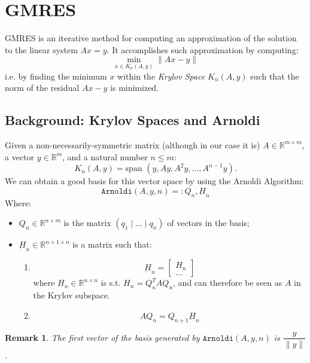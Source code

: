 \documentclass{article}
\newcommand{\reals}{\mathbb R}
\newcommand{\rmatr}[2]{\reals ^ {{#1} \times {#2}} }
\newcommand{\rvect}[1]{\reals ^ {{#1}} }
\newcommand{\spann}{\text{span }}
\newcommand{\hess}{\underbar H}
\newcommand{\arnoldi}{\texttt{Arnoldi}}
\newtheorem{remark}{Remark}
\begin{document}
 \section{GMRES}
 
GMRES is an iterative method for computing an approximation of the solution to the linear system $Ax = y$. It accomplishes such approximation by computing:
 \[\min_{x \in K_n(A, y)} \|Ax - y\|\]
 i.e. by finding the minimum $x$ within the \emph{Krylov Space} $K_n(A, y)$ such that the norm of the residual $Ax - y$ is minimized.
 \subsection{Background: Krylov Spaces and Arnoldi} 
 Given a non-necessarily-symmetric matrix (although in our case it is) $A \in \rmatr mm$, a vector $y \in \rvect m$, and a natural number $n\leq m$:
 \[K_n(A, y) = \spann (y, Ay, A^2y, \hdots, A^{n-1}y).\]
 We can obtain a good basis for this vector space by using the Arnoldi Algorithm:
 \[\arnoldi(A, y, n) =: Q_n, \hess_n\]
 Where:
 \begin{itemize}
  \item $Q_n \in \rmatr nm$ is the matrix $(q_1 \mid \hdots \mid q_n)$ of vectors in the basis;
  \item $\hess_n \in \rmatr {n+1} {n}$ is a matrix such that:
  \begin{enumerate}
   \item 
  \[\underbar H_n = \begin{bmatrix}
                     H_n\\
                     ...
                    \end{bmatrix}
\]
where $H_n \in \rmatr nn$ is s.t. $H_n = Q_n ^T A Q_n$, and can therefore be seen as $A$ in the Krylov subspace.
\item
  \begin{equation}
AQ_n = Q_{n+1} \hess_n \label{arnoldi_eq}
  \end{equation}
  \end{enumerate}

 \end{itemize}
 
 \begin{remark} \label{q1} The first vector of the basis generated by $\arnoldi(A, y, n)$ is $\dfrac y {\|y\|}$.
 \end{remark}
\end{document}
